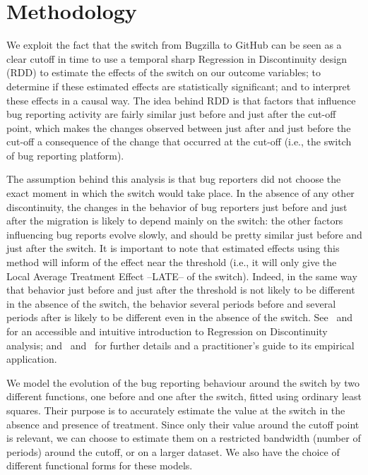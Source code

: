 \documentclass[conference]{IEEEtran}
\begin{document}
\section{Methodology}
\label{methodology}

We exploit the fact that the switch from Bugzilla to GitHub can be seen as a clear cutoff in time to use a temporal sharp Regression in Discontinuity design (RDD) to estimate the effects of the switch on our outcome variables; to determine if these estimated effects are statistically significant; and to interpret these effects in a causal way. 
The idea behind RDD is that factors that influence bug reporting activity are fairly similar just before and just after the cut-off point, which makes the changes observed between just after and just before the cut-off a consequence of the change that occurred at the cut-off (i.e., the switch of bug reporting platform).

The assumption behind this analysis is that bug reporters did not choose the exact moment in which the switch would take place. In the absence of any other discontinuity, the changes in the behavior of bug reporters just before and just after the migration is likely to depend mainly on the switch: the other factors influencing bug reports evolve slowly, and should be pretty similar just before and just after the switch. It is important to note that estimated effects using this method will inform of the effect near the threshold (i.e., it will only give the Local Average Treatment Effect --LATE-- of the switch). Indeed, in the same way that behavior just before and just after the threshold is not likely to be different in the absence of the switch, the behavior several periods before and several periods after is likely to be different even in the absence of the switch. See~\cite{angrist2014mastering} and~\cite{angrist2008mostly} for an accessible and intuitive introduction to Regression on Discontinuity analysis; and~\cite{lee2010regression} and~\cite{jacob2012practical} for further details and a practitioner's guide to its empirical application.

We model the evolution of the bug reporting behaviour around the switch by two different functions, one before and one after the switch, fitted using ordinary least squares. Their purpose is to accurately estimate the value at the switch in the absence and presence of treatment. Since only their value around the cutoff point is relevant, we can choose to estimate them on a restricted bandwidth (number of periods) around the cutoff, or on a larger dataset. We also have the choice of different functional forms for these models.
\end{document}
